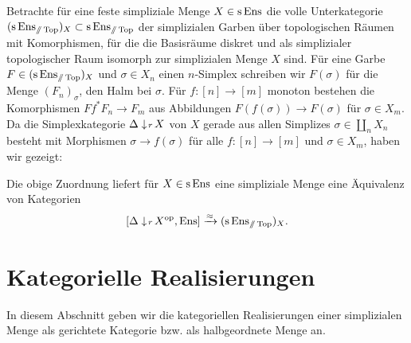 Betrachte für eine feste simpliziale Menge $X \in \operatorname{s}\operatorname{Ens}$ die volle
Unterkategorie $(\operatorname{s}\operatorname{Ens}_{\mathbin{/\mkern-6mu/} \operatorname{Top}})_X \subset \operatorname{s}\operatorname{Ens}_{\mathbin{/\mkern-6mu/} \operatorname{Top}}$ der simplizialen
Garben über topologischen Räumen mit Komorphismen, für die die
Basisräume diskret und als simplizialer topologischer Raum isomorph
zur simplizialen Menge $X$ sind. Für eine Garbe $F \in
(\operatorname{s}\operatorname{Ens}_{\mathbin{/\mkern-6mu/} \operatorname{Top}})_X$ und $\sigma \in X_n$ einen $n$-Simplex schreiben wir
$F(\sigma)$ für die Menge $(F_n)_\sigma$, den Halm bei $\sigma$. Für
$f: [n] \to [m]$ monoton bestehen die Komorphismen $Ff^* F_n \to F_m$
aus Abbildungen $F(f(\sigma)) \to F(\sigma)$ für $\sigma \in X_m$. Da
die Simplexkategorie $\Delta \downarrow \! {\scriptstyle r} \, X$ von $X$ gerade aus
allen Simplizes $\sigma \in \coprod_n X_n$ besteht mit Morphismen
$\sigma \to f(\sigma)$ für alle $f: [n] \to [m]$ und $\sigma \in X_m$,
haben wir gezeigt:
\begin{prop} \label{real-simplex-cat}
  Die obige Zuordnung liefert für $X \in \operatorname{s}\operatorname{Ens}$ eine simpliziale
  Menge eine Äquivalenz von Kategorien
  \[ [\Delta \downarrow \! {\scriptstyle r} \, X^\mathrm{op}, \operatorname{Ens}] \xrightarrow{\approx} (\operatorname{s}\operatorname{Ens}_{\mathbin{/\mkern-6mu/} \operatorname{Top}})_X. \]
\end{prop}

\section{Kategorielle Realisierungen}
\label{sec:real-cat}

In diesem Abschnitt geben wir die kategoriellen Realisierungen einer
simplizialen Menge als gerichtete Kategorie bzw. als halbgeordnete
Menge an.

